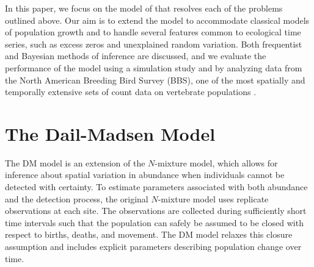 \documentclass[12pt,english]{article}
\begin{document}
\begin{spacing}{1.9}
\begin{flushleft}
In this paper, we focus on the model of \citet[henceforth the DM model]{dail_madsen:2011}
that resolves each of the problems outlined above. 
Our aim is to extend the
model to accommodate classical models of population growth and
to handle several features common to ecological
time series, such as excess zeros and unexplained random variation. 
Both frequentist and Bayesian methods of inference are discussed, and
we evaluate the performance of the model using a simulation study and by
analyzing data from the North American Breeding Bird Survey (BBS), one of
the most spatially and temporally extensive sets of count data on
vertebrate populations \citep{robbins_etal:1986}.


\section*{The Dail-Madsen Model}
\label{sec:dm}

The DM model is an extension of the 
\citet{royle:2004biom} $N$-mixture model, which allows for inference about spatial
variation in abundance when individuals cannot be detected with
certainty. To estimate parameters associated with both abundance 
and the detection process, the original $N$-mixture model uses replicate
observations at each site. The observations are collected during sufficiently
short time intervals such that the population can safely be
assumed to be closed with respect to births, deaths, and movement. The DM
model relaxes this closure assumption and includes explicit parameters
describing population change over time.



\end{flushleft}
\end{spacing}
\end{document}
